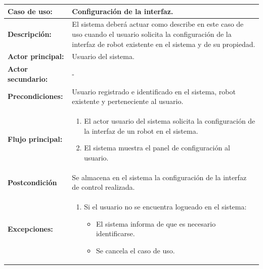 \begin{table}[H]
  \begin{center}
    \begin{tabular}{|p{3.5cm}|p{10cm}|}
      \hline
      {\textbf{Caso de uso:}} & { Configuración de la interfaz.} \\
      \hline
      {\textbf{Descripción:}} & { El sistema deberá actuar como describe en este caso de uso cuando el usuario solicita la configuración de la interfaz de robot existente en el sistema 
      y de su propiedad.} \\
     \hline
      {\textbf{Actor principal:}} & { Usuario del sistema.} \\
      \hline
      {\textbf{Actor secundario:}} & { - } \\
      \hline
      {\textbf{Precondiciones:}} & { Usuario registrado e identificado en el sistema, robot existente y perteneciente al usuario. } \\
     \hline   
    {\textbf{Flujo principal:}} & { 
      \begin{enumerate}
	\item El actor usuario del sistema solicita la configuración de la interfaz de un robot en el sistema.
        \item El sistema muestra el panel de configuración al usuario.
      \end{enumerate}
      } \\
     \hline
     {\textbf{Postcondición}} & {Se almacena en el sistema la configuración de la interfaz de control realizada.}\\
     \hline
         {\textbf{Excepciones:}} & {
         \begin{enumerate}
                   \item Si el usuario no se encuentra logueado en el sistema:
	  \begin{itemize}
	    \item El sistema informa de que es necesario identificarse.
	    \item Se cancela el caso de uso.
	  \end{itemize}
         

\end{enumerate}}
\end{tabular}
\end{center}
\end{table}
